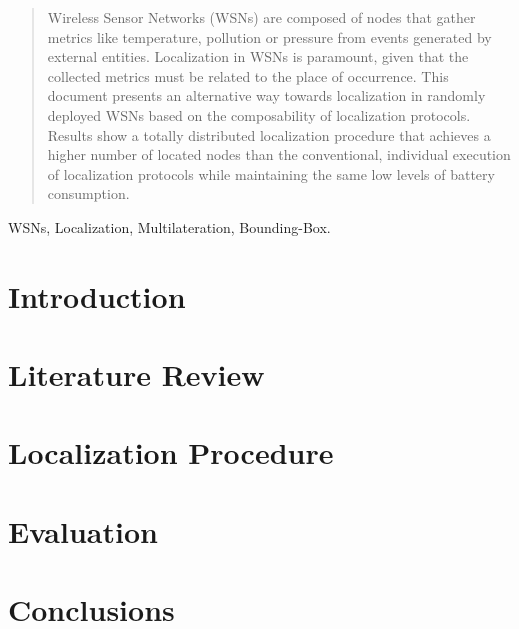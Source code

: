 \documentclass[conference]{IEEEtran}
\begin{document}
\begin{abstract}
\boldmath Wireless Sensor Networks (WSNs) are composed of nodes that gather metrics like temperature, pollution or pressure from events generated by external entities. Localization in WSNs is paramount, given that the collected metrics must be related to the place of occurrence. This document presents an alternative way towards localization in randomly deployed WSNs based on the composability of localization protocols. Results show a totally distributed localization procedure that achieves a higher number of located nodes than the conventional, individual execution of localization protocols while maintaining the same low levels of battery consumption.

% 

\end{abstract}

\begin{IEEEkeywords}
WSNs, Localization, Multilateration, Bounding-Box.
\end{IEEEkeywords}

\section{Introduction} \label{introduction}
  
  
\section{Literature Review} \label{literature}
  
  
\section{Localization Procedure} \label{locProc}
  

\section{Evaluation} \label{simulation}
  

\section{Conclusions} \label{conclusions}
  
  


  
\end{document}
